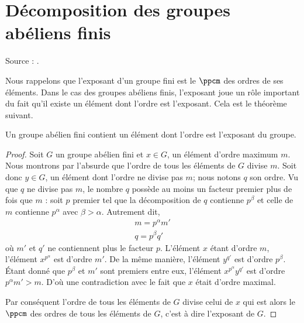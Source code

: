 \section{Décomposition des groupes abéliens finis}
 
Source : \cite{FabricegPSFinis}.

Nous rappelons que l'exposant d'un groupe fini est le \( \ppcm\) des ordres de ses éléments. Dans le cas des groupes abéliens finis, l'exposant joue un rôle important du fait qu'il existe un élément dont l'ordre est l'exposant. Cela est le théorème suivant.

\begin{theorem}
    Un groupe abélien fini contient un élément dont l'ordre est l'exposant du groupe.
\end{theorem}

\begin{proof}
    Soit \( G\) un groupe abélien fini et \( x\in G\), un élément d'ordre maximum \( m\). Nous montrons par l'absurde que l'ordre de tous les éléments de \( G\) divise \( m\). Soit donc \( y\in G\), un élément dont l'ordre ne divise pas \( m\); nous notons $q$ son ordre. Vu que \( q\) ne divise pas \( m\), le nombre \( q\) possède au moins un facteur premier plus de fois que \( m\) : soit \( p\) premier tel que la décomposition de \( q\) contienne \( p^{\beta}\) et celle de \( m\) contienne \( p^{\alpha}\) avec \( \beta>\alpha\). Autrement dit,
    \begin{subequations}
        \begin{align}
            m=p^{\alpha}m'\\
            q=p^{\beta}q'
        \end{align}
    \end{subequations}
    où \( m'\) et \( q'\) ne contiennent plus le facteur \( p\). L'élément \( x\) étant d'ordre \( m\), l'élément \( x^{p^{\alpha}}\) est d'ordre \( m'\). De la même manière, l'élément \( y^{q'}\) est d'ordre \( p^{\beta}\). Étant donné que \( p^{\beta}\) et \( m'\) sont premiers entre eux, l'élément  \( x^{p^{\alpha}}y^{q'}\) est d'ordre \( p^{\alpha}m'>m\). D'où une contradiction avec le fait que \( x\) était d'ordre maximal.

    Par conséquent l'ordre de tous les éléments de $G$ divise celui de \( x\) qui est alors le \( \ppcm\) des ordres de tous les éléments de \( G\), c'est à dire l'exposant de \( G\).
\end{proof}

